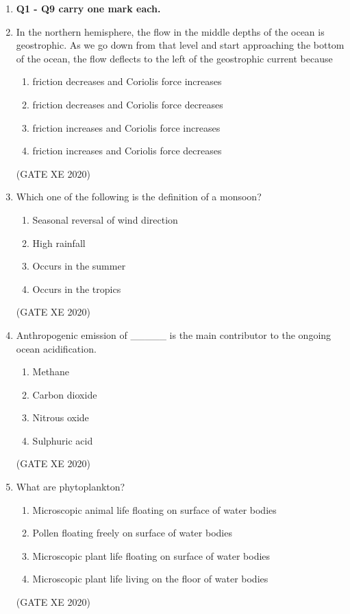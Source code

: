 \documentclass[12pt]{article}
\begin{document}
\begin{enumerate}

\item[] \textbf{Q1 - Q9 carry one mark each.}
\item In the northern hemisphere, the flow in the middle depths of the ocean is geostrophic. As we go down from that level and start approaching the bottom of the ocean, the flow deflects to the left of the geostrophic current because
\begin{enumerate}
\item friction decreases and Coriolis force increases
\item friction decreases and Coriolis force decreases
\item friction increases and Coriolis force increases
\item friction increases and Coriolis force decreases
\end{enumerate}
(GATE XE 2020)

\item Which one of the following is the definition of a monsoon?
\begin{enumerate}
\item Seasonal reversal of wind direction
\item High rainfall
\item Occurs in the summer
\item Occurs in the tropics
\end{enumerate}
(GATE XE 2020)

\item Anthropogenic emission of \_\_\_\_\_ is the main contributor to the ongoing ocean acidification.
\begin{enumerate}
\item Methane
\item Carbon dioxide
\item Nitrous oxide
\item Sulphuric acid
\end{enumerate}
(GATE XE 2020)

\item What are phytoplankton?
\begin{enumerate}
\item Microscopic animal life floating on surface of water bodies
\item Pollen floating freely on surface of water bodies
\item Microscopic plant life floating on surface of water bodies
\item Microscopic plant life living on the floor of water bodies
\end{enumerate}
(GATE XE 2020)


\end{enumerate}
\end{document}
